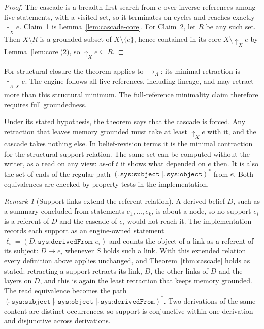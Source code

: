 \documentclass[11pt]{article}
\theoremstyle{plain}
\theoremstyle{definition}
\theoremstyle{remark}
\newtheorem{remark}{Remark}
\newcommand{\refs}{\rightarrow}          %
\newcommand{\dep}{{\uparrow}}            %
\newcommand{\sys}[1]{\texttt{sys:#1}}
\newcommand{\Lin}{\Lambda}               %
\begin{document}
\begin{proof}
The cascade is a breadth-first search from $e$ over inverse references among
live statements, with a visited set, so it terminates on cycles and reaches
exactly $\dep_X e$. Claim~1 is Lemma~\ref{lem:cascade-core}. For Claim~2, let
$R$ be any such set. Then $X\setminus R$ is a grounded subset of
$X\setminus\{e\}$, hence contained in its core $X\setminus\dep_X e$ by
Lemma~\ref{lem:core}(2), so $\dep_X e\subseteq R$.
\end{proof}

For structural closure the theorem applies to $\refs_{\Lin}$: its minimal
retraction is $\dep_{\Lin,X}e$. The engine follows all live references, including
lineage, and may retract more than this structural minimum. The full-reference
minimality claim therefore requires full groundedness.

Under its stated hypothesis, the theorem says that the cascade is forced. Any retraction that leaves memory
grounded must take at least $\dep_X e$ with it, and the cascade takes nothing
else. In belief-revision terms it is the minimal contraction for the
structural support relation. The same set can be computed without the writer,
as a read on any view: as-of $t$ it shows what depended on $e$ then. It is also
the set of ends of the regular path $(\hat{}\,\sys{subject}\mid\hat{}\,\sys{object})^{*}$
from $e$. Both equivalences are checked by property tests in the
implementation.

\begin{remark}[Support links extend the referent relation]\label{rem:support}
A derived belief $D$, such as a summary concluded from statements
$e_1,\dots,e_k$, is about a node, so no support $e_i$ is a referent of $D$ and
the cascade of $e_i$ would not reach it. The implementation records each
support as an engine-owned statement $\ell_i=(D,\sys{derivedFrom},e_i)$ and
counts the object of a link as a referent of its subject: $D\refs e_i$ whenever
$S$ holds such a link. With this extended relation every definition above
applies unchanged, and Theorem~\ref{thm:cascade} holds as stated: retracting a
support retracts its link, $D$, the other links of $D$ and the layers on $D$,
and this is again the least retraction that keeps memory grounded. The read
equivalence becomes the path
$(\hat{}\,\sys{subject}\mid\hat{}\,\sys{object}\mid\hat{}\,\sys{derivedFrom})^{*}$.
Two derivations of the same content are distinct occurrences, so support is
conjunctive within one derivation and disjunctive across derivations.
\end{remark}
\end{document}
